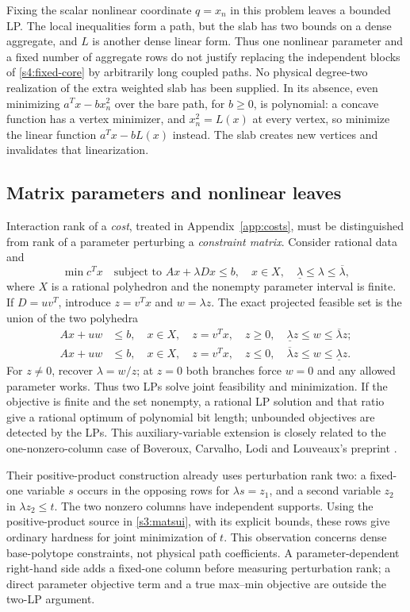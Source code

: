 Fixing the scalar nonlinear coordinate $q=x_n$ in this problem leaves
a bounded LP. The local inequalities form a path, but the slab has two
bounds on a dense aggregate, and $L$ is another dense linear form.
Thus one nonlinear parameter and a fixed number of aggregate rows do
not justify replacing the independent blocks of \cref{s4:fixed-core}
by arbitrarily long coupled paths. No physical degree-two realization
of the extra weighted slab has been supplied. In its absence, even
minimizing $a^Tx-bx_n^2$ over the bare path, for $b\ge0$, is polynomial:
a concave function has a vertex minimizer, and $x_n^2=L(x)$ at every
vertex, so minimize the linear function $a^Tx-bL(x)$ instead. The slab
creates new vertices and invalidates that linearization.

\subsection{Matrix parameters and nonlinear leaves}\label{s6:parametric}
Interaction rank of a \emph{cost}, treated in Appendix~\ref{app:costs},
must be distinguished from rank of a
parameter perturbing a \emph{constraint matrix}.
Consider rational data and
\[
 \min c^Tx\quad\text{subject to }Ax+\lambda Dx\le b,
 \quad x\in X,\quad\underline\lambda\le\lambda\le\overline\lambda,
\]
where $X$ is a rational polyhedron and the nonempty parameter interval
is finite. If $D=uv^T$, introduce $z=v^Tx$ and $w=\lambda z$.
The exact projected feasible set is the union of the two polyhedra
\begin{align*}
 Ax+uw&\le b,\quad x\in X,\quad z=v^Tx,\quad
 z\ge0,\quad\underline\lambda z\le w\le\overline\lambda z;\\
 Ax+uw&\le b,\quad x\in X,\quad z=v^Tx,\quad
 z\le0,\quad\overline\lambda z\le w\le\underline\lambda z.
\end{align*}
For $z\ne0$, recover $\lambda=w/z$; at $z=0$ both branches force
$w=0$ and any allowed parameter works. Thus two LPs solve joint
feasibility and minimization. If the objective is finite and the set
nonempty, a rational LP solution and that ratio give a rational optimum
of polynomial bit length; unbounded objectives are detected by the LPs.
This auxiliary-variable extension is closely related to the
one-nonzero-column case of Boveroux, Carvalho, Lodi and Louveaux's
preprint \cite[Section~3.3]{s6:boveroux2026}.

Their positive-product construction already uses perturbation rank two:
a fixed-one variable $s$ occurs in the opposing rows for
$\lambda s=z_1$, and a second variable $z_2$ in
$\lambda z_2\le t$. The two nonzero columns have independent supports.
Using the positive-product source in \cref{s3:matsui}, with its explicit
bounds, these rows give ordinary hardness for joint minimization of $t$.
This observation concerns dense base-polytope constraints, not physical
path coefficients. A parameter-dependent right-hand side adds a fixed-one
column before measuring perturbation rank; a direct parameter objective
term and a true max--min objective are outside the two-LP argument.

